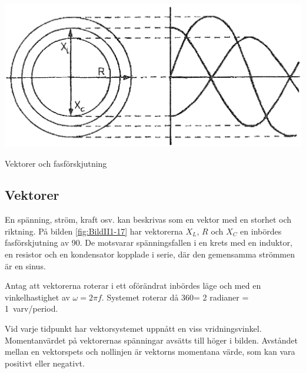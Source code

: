 \begin{marginfigure}%
  \includegraphics[]{images/cropped_pdfs/bild_2_1-17.pdf}
  \caption{Vektorer och fasförskjutning}
  \label{fig:BildII1-17}
\end{marginfigure}

\subsection{Vektorer}

En spänning, ström, kraft osv. kan beskrivas som en vektor med en storhet och
riktning.
På bilden \ref{fig:BildII1-17} har vektorerna \(X_L\), \(R\) och \(X_C\) en
inbördes fasförskjutning av 90\degree.
De motsvarar spänningsfallen i en krets med en induktor, en resistor och en
kondensator kopplade i serie, där den gemensamma strömmen är en sinus.

Antag att vektorerna roterar i ett oförändrat inbördes läge och med en
vinkelhastighet av \(\omega= 2\pi f\).
Systemet roterar då 360\degree = \SI{2}{\pi} radianer = \SI{1}{varv/period}.

Vid varje tidpunkt har vektorsystemet uppnått en viss vridningsvinkel.
Momentanvärdet på vektorernas spänningar avsätts till höger i bilden.
Avståndet mellan en vektorspets och nollinjen är vektorns momentana värde,
som kan vara positivt eller negativt.
